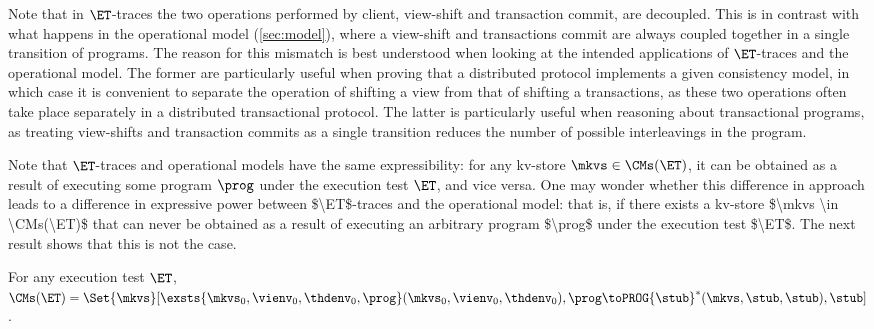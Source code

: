 Note that in $\ET$-traces the two operations performed by client, view-shift and 
transaction commit, are decoupled. This is in contrast with what happens in the operational model (\cref{sec:model}), 
where a view-shift and transactions commit are always coupled together in a single transition of programs. 
The reason for this mismatch is best understood when looking at the intended applications of 
$\ET$-traces and the operational model. The former are particularly useful when proving that a distributed 
protocol implements a given consistency model, in which case it is convenient to separate the operation of shifting a view from that of shifting a transactions, 
as these two operations often take place separately in a distributed transactional protocol. The latter is particularly useful when reasoning about transactional 
programs, as treating view-shifts and transaction commits as a single transition reduces the number of possible interleavings in the program.

Note that $\ET$-traces and operational models have the same expressibility: 
for any kv-store $\mkvs \in \CMs(\ET)$, it can be obtained as a result of 
executing some program $\prog$ under the execution test $\ET$, and vice versa.
\ac{One may wonder whether this difference in approach leads to a difference in expressive power between $\ET$-traces 
and the operational model: that is, if there exists a kv-store $\mkvs \in \CMs(\ET)$ that can never be obtained as a 
result of executing an arbitrary program $\prog$ under the execution test $\ET$. The next result shows that 
this is not the case.}
%

\begin{theorem}
    For any execution test $\ET$, $\CMs(\ET) = \Set{\mkvs}[\exsts{\mkvs_0, \vienv_0, \thdenv_0, \prog} (\mkvs_0, \vienv_0, \thdenv_0), \prog \toPROG{\stub}^{*} (\mkvs, \stub, \stub), \stub]$.
\end{theorem}

